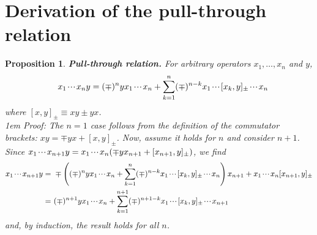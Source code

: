 \documentclass[11pt,fleqn]{article}
\newcommand{\ld}{\ensuremath{\ldots}}
\newcommand{\etc}{\ensuremath{\mathinner{\mkern-1mu\cdotp\mkern-2mu\cdotp\mkern-2mu\cdotp\mkern-1mu}}}
\newcommand{\bmit}[1]{{\bfseries\itshape\mathversion{bold}#1}}
\newcommand{\pr}[1]{\ensuremath{\left(#1\right)}}
\theoremstyle{mystyle}
\newtheorem{pro}{Proposition}[section]
\numberwithin{equation}{section}
\begin{document}
\appendix

\section{Derivation of the pull-through relation}

\begin{pro}
\label{pull-through}
\bmit{Pull-through relation.}
\textit{For arbitrary operators $x_1,\ld,x_n$ and $y$,
\begin{align*}
&&
  x_1\etc x_ny
=
  (\mp)^n
  yx_1\etc x_n
+
  \sum_{k=1}^n(\mp)^{n-k}x_1\etc[x_k,y]_{\pm}\etc x_n
\end{align*}
where $[x,y]_{\pm}\equiv xy\pm yx$.}
\\\hangindent1em
Proof: 
The $n=1$ case follows from the definition of the commutator brackets: $xy =\mp yx + [x,y]_{\pm}$.
Now, assume it holds for $n$ and consider $n+1$.
Since $x_1\etc x_{n+1}y=x_1\etc x_n(\mp yx_{n+1}+[x_{n+1},y]_{\pm})$, we find
\begin{align*}
  x_1\etc x_{n+1}y
=&\
\mp
  \pr{
    (\mp)^n
    yx_1\etc x_n
  +
    \sum_{k=1}^n
    (\mp)^{n-k}
    x_1\etc [x_k,y]_{\pm}\etc x_n
  }
  x_{n+1}
+
  x_1\etc x_n[x_{n+1},y]_{\pm}
\\=&\
  (\mp)^{n+1}
  yx_1\etc x_n
+
  \sum_{k=1}^{n+1}
  (\mp)^{n+1-k}
  x_1\etc[x_k,y]_{\pm}\etc x_{n+1}
\end{align*}
and, by induction, the result holds for all $n$.
\end{pro}
\end{document}
